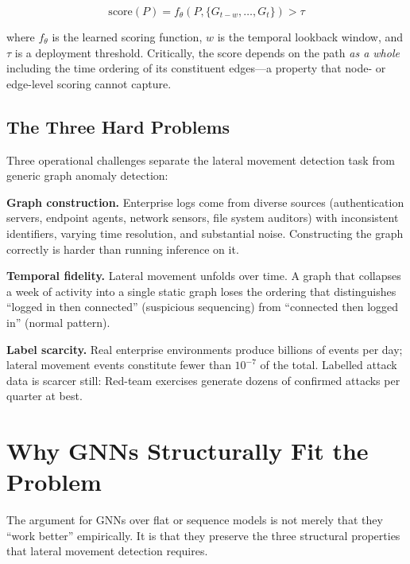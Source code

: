 \documentclass[sigconf,nonacm]{acmart}
\begin{document}
\begin{equation}
  \mathrm{score}(P) = f_\theta(P, \{G_{t-w}, \ldots, G_t\}) > \tau
\end{equation}

where $f_\theta$ is the learned scoring function, $w$ is the temporal lookback
window, and $\tau$ is a deployment threshold. Critically, the score depends on
the path \emph{as a whole} including the time ordering of its constituent
edges---a property that node- or edge-level scoring cannot capture.

\subsection{The Three Hard Problems}

Three operational challenges separate the lateral movement detection task
from generic graph anomaly detection:

\textbf{Graph construction.} Enterprise logs come from diverse sources
(authentication servers, endpoint agents, network sensors, file system
auditors) with inconsistent identifiers, varying time resolution, and
substantial noise. Constructing the graph correctly is harder than running
inference on it.

\textbf{Temporal fidelity.} Lateral movement unfolds over time. A graph that
collapses a week of activity into a single static graph loses the ordering
that distinguishes ``logged in then connected'' (suspicious sequencing) from
``connected then logged in'' (normal pattern).

\textbf{Label scarcity.} Real enterprise environments produce billions of
events per day; lateral movement events constitute fewer than $10^{-7}$ of
the total. Labelled attack data is scarcer still: Red-team exercises
generate dozens of confirmed attacks per quarter at best.

\section{Why GNNs Structurally Fit the Problem}
\label{sec:why_gnn}

The argument for GNNs over flat or sequence models is not merely that they
``work better'' empirically. It is that they preserve the three structural
properties that lateral movement detection requires.
\end{document}
